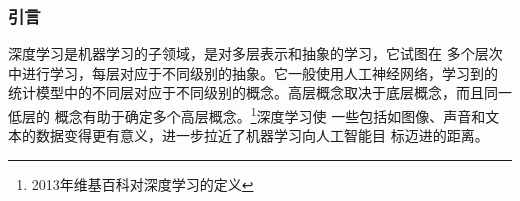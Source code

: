 \begin{frame}[fragile]
  \frametitle{引言}深度学习是机器学习的子领域，是对多层表示和抽象的学习，它试图在
  多个层次中进行学习，每层对应于不同级别的抽象。它一般使用人工神经网络，学习到的
  统计模型中的不同层对应于不同级别的概念。高层概念取决于底层概念，而且同一低层的
  概念有助于确定多个高层概念。\footnote{2013年维基百科对深度学习的定义}深度学习使
  一些包括如图像、声音和文本的数据变得更有意义，进一步拉近了机器学习向人工智能目
  标迈进的距离。
  
\end{frame}
